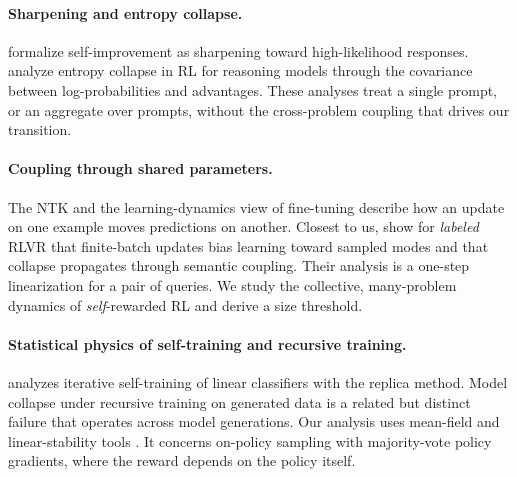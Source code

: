 \paragraph{Sharpening and entropy collapse.}
\citet{huang2025sharpening} formalize self-improvement as sharpening toward high-likelihood responses.
\citet{cui2025entropy} analyze entropy collapse in RL for reasoning models through the covariance between log-probabilities and advantages.
These analyses treat a single prompt, or an aggregate over prompts, without the cross-problem coupling that drives our transition.

\paragraph{Coupling through shared parameters.}
The NTK \citep{jacot2018ntk} and the learning-dynamics view of fine-tuning \citep{ren2025learning} describe how an update on one example moves predictions on another.
Closest to us, \citet{fan2026sharpening} show for \emph{labeled} RLVR that finite-batch updates bias learning toward sampled modes and that collapse propagates through semantic coupling. Their analysis is a one-step linearization for a pair of queries.
We study the collective, many-problem dynamics of \emph{self}-rewarded RL and derive a size threshold.

\paragraph{Statistical physics of self-training and recursive training.}
\citet{takahashi2026selftraining} analyzes iterative self-training of linear classifiers with the replica method.
Model collapse under recursive training on generated data \citep{shumailov2024collapse} is a related but distinct failure that operates across model generations.
Our analysis uses mean-field and linear-stability tools \citep{nishimori2001}. It concerns on-policy sampling with majority-vote policy gradients, where the reward depends on the policy itself.
